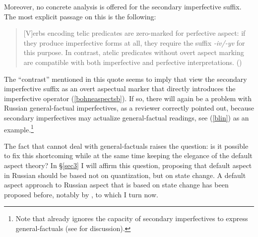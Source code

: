 \documentclass[output=paper,colorlinks,citecolor=brown]{langscibook}
\begin{document}
Moreover, no concrete analysis is offered for the secondary imperfective suffix. The most explicit passage on this is the following: 

\begin{quote}
    [V]erbs encoding telic predicates are zero-marked for perfective aspect: if they produce imperfective forms at all, they require the suffix \textit{-iv/-yv} for this purpose. In contrast, atelic predicates without overt aspect marking are compatible with both imperfective and perfective interpretations. (\citealt[274]{Bohne2004})  
    \end{quote}
    
The ``contrast'' mentioned in this quote seems to imply that \citet{Bohne2004} view the secondary imperfective suffix as an overt     aspectual marker that directly introduces the imperfective operator (\ref{bohneaspectsb}). If so, there will again be a problem with Russian general-factual imperfectives, as a reviewer correctly pointed out, because secondary imperfectives may actualize general-factual readings, see (\ref{blin}) as an example.\footnote{Note that already \citet{Klein1995} ignores the capacity of secondary imperfectives to express general-factuals (see \citealt[53ff.]{Gronn2004} for discussion).} 

The fact that \citet{Bohne2004} cannot deal with general-factuals raises the question: is it possible to fix this shortcoming while at the same time keeping the elegance of the default aspect theory? 
In \S\ref{sec3} I will affirm this question, proposing that default aspect in Russian should be based not on quantization, but on state change. 
A default aspect approach to Russian aspect that is based on state change has been proposed before, notably by \citet{Ramchand08}, to which I turn now.  
\end{document}

